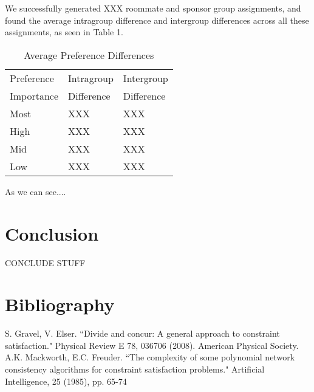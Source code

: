 \documentclass[letterpaper]{article}
\begin{document}
\begin{itemize}
We successfully generated XXX roommate and sponsor group assignments, and found the average intragroup difference and intergroup differences across all these assignments, as seen in Table 1. \\

\begin{table}[h]
\begin{center}
\begin{tabular}{|l|l|l|}
\hline
Preference & Intragroup & Intergroup  \\
Importance & Difference & Difference \\
\hline
Most & XXX & XXX \\
High & XXX & XXX \\
Mid & XXX & XXX \\
Low & XXX & XXX \\
\hline
\end{tabular}
\end{center}
\caption{Average Preference Differences}
\end{table}

As we can see.... 



\end{itemize}

\section{Conclusion}

CONCLUDE STUFF

\section{Bibliography}

S. Gravel, V. Elser. ``Divide and concur: A general approach to constraint satisfaction." Physical Review E 78, 036706 (2008). American Physical Society.  \\

\noindent A.K. Mackworth, E.C. Freuder. ``The complexity of some polynomial network consistency algorithms for constraint satisfaction problems." Artificial Intelligence, 25 (1985), pp. 65-74
\end{document}
